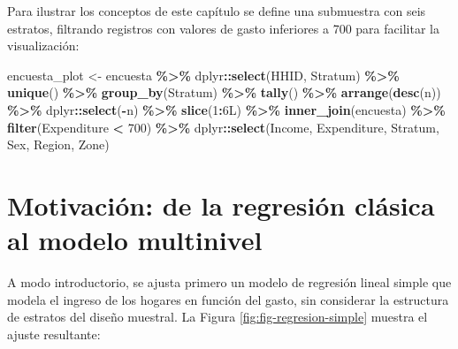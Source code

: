 \documentclass[
  spanish,
  12pt,
]{book}
\newenvironment{Shaded}{\begin{snugshade}}{\end{snugshade}}
\newcommand{\DataTypeTok}[1]{\textcolor[rgb]{0.13,0.29,0.53}{#1}}
\newcommand{\DecValTok}[1]{\textcolor[rgb]{0.00,0.00,0.81}{#1}}
\newcommand{\FunctionTok}[1]{\textcolor[rgb]{0.13,0.29,0.53}{\textbf{#1}}}
\newcommand{\NormalTok}[1]{#1}
\newcommand{\OtherTok}[1]{\textcolor[rgb]{0.56,0.35,0.01}{#1}}
\newcommand{\SpecialCharTok}[1]{\textcolor[rgb]{0.81,0.36,0.00}{\textbf{#1}}}
\begin{document}
Para ilustrar los conceptos de este capítulo se define una submuestra con seis estratos, filtrando registros con valores de gasto inferiores a 700 para facilitar la visualización:

\begin{Shaded}
\begin{Highlighting}[]
\NormalTok{encuesta\_plot }\OtherTok{\textless{}{-}}\NormalTok{ encuesta }\SpecialCharTok{\%\textgreater{}\%}
\NormalTok{  dplyr}\SpecialCharTok{::}\FunctionTok{select}\NormalTok{(HHID, Stratum) }\SpecialCharTok{\%\textgreater{}\%}
  \FunctionTok{unique}\NormalTok{() }\SpecialCharTok{\%\textgreater{}\%}
  \FunctionTok{group\_by}\NormalTok{(Stratum) }\SpecialCharTok{\%\textgreater{}\%}
  \FunctionTok{tally}\NormalTok{() }\SpecialCharTok{\%\textgreater{}\%}
  \FunctionTok{arrange}\NormalTok{(}\FunctionTok{desc}\NormalTok{(n)) }\SpecialCharTok{\%\textgreater{}\%}
\NormalTok{  dplyr}\SpecialCharTok{::}\FunctionTok{select}\NormalTok{(}\SpecialCharTok{{-}}\NormalTok{n) }\SpecialCharTok{\%\textgreater{}\%}
  \FunctionTok{slice}\NormalTok{(}\DecValTok{1}\SpecialCharTok{:}\DecValTok{6}\DataTypeTok{L}\NormalTok{) }\SpecialCharTok{\%\textgreater{}\%}
  \FunctionTok{inner\_join}\NormalTok{(encuesta) }\SpecialCharTok{\%\textgreater{}\%}
  \FunctionTok{filter}\NormalTok{(Expenditure }\SpecialCharTok{\textless{}} \DecValTok{700}\NormalTok{) }\SpecialCharTok{\%\textgreater{}\%}
\NormalTok{  dplyr}\SpecialCharTok{::}\FunctionTok{select}\NormalTok{(Income, Expenditure, Stratum, Sex, Region, Zone)}
\end{Highlighting}
\end{Shaded}

\section{Motivación: de la regresión clásica al modelo multinivel}\label{sec-motivacionMult}

A modo introductorio, se ajusta primero un modelo de regresión lineal simple que modela el ingreso de los hogares en función del gasto, sin considerar la estructura de estratos del diseño muestral. La Figura \ref{fig:fig-regresion-simple} muestra el ajuste resultante:
\end{document}
